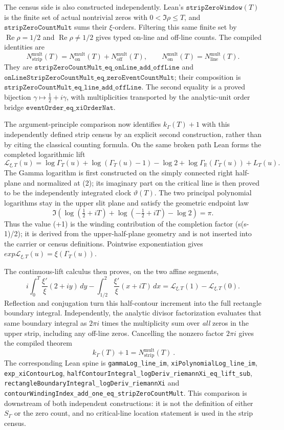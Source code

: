 \documentclass[11pt]{article}
\theoremstyle{definition}
\renewcommand{\Re}{\operatorname{Re}}
\begin{document}
The census side is also constructed independently.  Lean's
\(\texttt{stripZeroWindow}(T)\) is the finite set of actual nontrivial zeros
with \(0<\Im\rho\leq T\), and \(\texttt{stripZeroCountMult}\) sums their
\(\xi\)-orders.  Filtering this same finite set by
\(\Re\rho=1/2\) and \(\Re\rho\neq1/2\) gives typed on-line and off-line
counts.  The compiled identities are
\[
 N_{\mathrm{strip}}^{\mathrm{mult}}(T)
 =N_{\mathrm{on}}^{\mathrm{mult}}(T)
  +N_{\mathrm{off}}^{\mathrm{mult}}(T),
 \qquad
 N_{\mathrm{on}}^{\mathrm{mult}}(T)
 =N_{\mathrm{line}}^{\mathrm{mult}}(T).
\]
They are \(\texttt{stripZeroCountMult\_eq\_onLine\_add\_offLine}\) and
\(\texttt{onLineStripZeroCountMult\_eq\_zeroEventCountMult}\); their
composition is \(\texttt{stripZeroCountMult\_eq\_line\_add\_offLine}\).
The second equality is a proved bijection
\(\gamma\mapsto\frac12+i\gamma\), with multiplicities transported by the
analytic-unit order bridge \(\texttt{eventOrder\_eq\_xiOrderNat}\).

The argument-principle comparison now identifies \(k_\Gamma(T)+1\) with this
independently defined strip census by an explicit second construction, rather
than by citing the classical counting formula.  On the same broken path Lean
forms the completed logarithmic lift
\[
 \mathcal L_{\xi,T}(u)=
 \log\Gamma_T(u)+\log(\Gamma_T(u)-1)-\log 2
 +\log\Gamma_{\mathbb R}(\Gamma_T(u))+L_T(u).
\]
The Gamma logarithm is first constructed on the simply connected right
half-plane and normalized at (2); its imaginary part on the critical line is
then proved to be the independently integrated clock \(\vartheta(T)\).  The
two principal polynomial logarithms stay in the upper slit plane and satisfy
the geometric endpoint law
\[
 \Im\!\left(\log(\tfrac12+iT)+
             \log(-\tfrac12+iT)-\log2\right)=\pi.
\]
Thus the value (+1) is the winding contribution of the completion factor
(s(s-1)/2); it is derived from the upper-half-plane geometry and is not
inserted into the carrier or census definitions.  Pointwise exponentiation
gives
\(exp \mathcal L_{\xi,T}(u)=\xi(\Gamma_T(u))\).

The continuous-lift calculus then proves, on the two affine segments,
\[
 i\int_0^T\frac{\xi'}{\xi}(2+iy)\,dy
 -\int_{1/2}^{2}\frac{\xi'}{\xi}(x+iT)\,dx
 =\mathcal L_{\xi,T}(1)-\mathcal L_{\xi,T}(0).
\]
Reflection and conjugation turn this half-contour increment into the full
rectangle boundary integral.  Independently, the analytic divisor
factorization evaluates that same boundary integral as \(2\pi i\) times the
multiplicity sum over \emph{all} zeros in the upper strip, including any
off-line zeros.  Cancelling the nonzero factor \(2\pi i\) gives the compiled
theorem
\[
 \boxed{\ k_\Gamma(T)+1=N_{\mathrm{strip}}^{\mathrm{mult}}(T)\ }.
\]
The corresponding Lean spine is
\texttt{gammaLog\_line\_im},
\texttt{xiPolynomialLog\_line\_im},
\texttt{exp\_xiContourLog},
\texttt{halfContourIntegral\_logDeriv\_riemannXi\_eq\_lift\_sub},
\texttt{rectangleBoundaryIntegral\_logDeriv\_riemannXi} and
\texttt{contourWindingIndex\_add\_one\_eq\_stripZeroCountMult}.
This comparison is downstream of both independent constructions: it is not
the definition of either \(S_\Gamma\) or the zero count, and no critical-line
location statement is used in the strip census.
\end{document}
